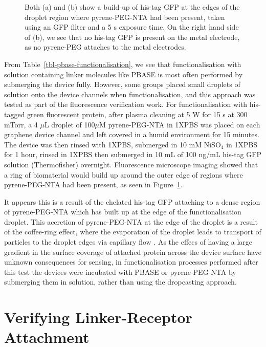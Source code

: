 \documentclass[
  a4paper,
]{scrbook}
\begin{document}
\begin{figure}
\begin{minipage}[t]{0.47\linewidth}
{{}

}

\subcaption{\label{fig-GFP-coffee-ring-2}}
\end{minipage}%

\caption{\label{fig-GFP-coffee-ring}Both (a) and (b) show a build-up of
his-tag GFP at the edges of the droplet region where pyrene-PEG-NTA had
been present, taken using an GFP filter and a 5 s exposure time. On the
right hand side of (b), we see that no his-tag GFP is present on the
metal electrode, as no pyrene-PEG attaches to the metal electrodes.}

\end{figure}

From Table~\ref{tbl-pbase-functionalisation}, we see that
functionalisation with solution containing linker molecules like PBASE
is most often performed by submerging the device fully. However, some
groups placed small droplets of solution onto the device channels when
functionalisation, and this approach was tested as part of the
fluorescence verification work. For functionalisation with his-tagged
green fluorescent protein, after plasma cleaning at 5 W for 15 s at 300
mTorr, a 4 \(\mu\)L droplet of 100\(\mu\)M pyrene-PEG-NTA in 1XPBS was
placed on each graphene device channel and left covered in a humid
environment for 15 minutes. The device was then rinsed with 1XPBS,
submerged in 10 mM NiSO\(_4\) in 1XPBS for 1 hour, rinsed in 1XPBS then
submerged in 10 mL of 100 ng/mL his-tag GFP solution (Thermofisher)
overnight. Fluorescence microscope imaging showed that a ring of
biomaterial would build up around the outer edge of regions where
pyrene-PEG-NTA had been present, as seen in
Figure~\ref{fig-GFP-coffee-ring}.

It appears this is a result of the chelated his-tag GFP attaching to a
dense region of pyrene-PEG-NTA which has built up at the edge of the
functionalisation droplet. This accretion of pyrene-PEG-NTA at the edge
of the droplet is a result of the coffee-ring effect, where the
evaporation of the droplet leads to transport of particles to the
droplet edges via capillary flow \autocite{Deegan1997,Shimobayashi2018}.
As the effecs of having a large gradient in the surface coverage of
attached protein across the device surface have unknown consequences for
sensing, in functionalisation processes performed after this test the
devices were incubated with PBASE or pyrene-PEG-NTA by submerging them
in solution, rather than using the dropcasting approach.

\hypertarget{sec-linker-receptor-attachment}{%
\section{Verifying Linker-Receptor
Attachment}\label{sec-linker-receptor-attachment}}
\end{document}
